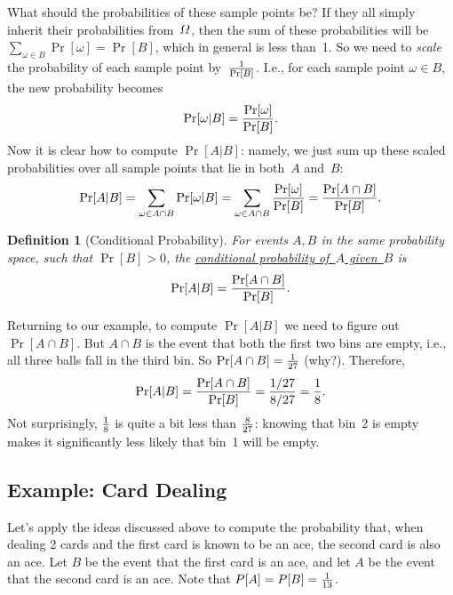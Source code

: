 \documentclass[11pt]{article}
\def\ul#1{\underline{#1}}
\def\VarOmega{\mathchar"10A }
\newcounter{thm}
\newtheorem{definition}{Definition}[thm]
\begin{document}
\begin{center}
\end{center}

What should the probabilities
of these sample points be?  If they all simply inherit their
probabilities from~$\VarOmega$, then the sum of these probabilities
will be $\sum_{\omega\in B}\Pr[\omega]=\Pr[B]$, which in general
is less than~1.  So we need to {\it scale\/} the probability
of each sample point by~$1\over{\Pr[B]}$.  I.e., for each sample
point $\omega\in B$, the new probability becomes $$
   \Pr[\omega\vert B]={{\Pr[\omega]}\over{\Pr[B]}}.  $$
   Now it is clear how to compute $\Pr[A\vert B]$: namely, we just
sum up these scaled probabilities over all sample points that
lie in both~$A$ and~$B$:  $$
   \Pr[A\vert B] = \sum_{\omega\in A\cap B} \Pr[\omega\vert B]
                 = \sum_{\omega\in A\cap B} {{\Pr[\omega]\over{\Pr[B]}}}
                 = {{\Pr[A\cap B]}\over{\Pr[B]}}.  $$

\begin{definition}[Conditional Probability]\label{defcp}
For events $A,B$ in the same probability space, such that 
$\Pr[B]>0$, the \ul{conditional probability of~$A$ given~$B$}
is $$
   \Pr[A\vert B] = {{\Pr[A\cap B]}\over{\Pr[B]}}.  $$
\end{definition}
   
Returning to our example, to compute $\Pr[A\vert B]$
we need to figure out $\Pr[A\cap B]$.  But $A\cap B$ is the event 
that both the first two bins are empty, i.e., all three balls fall in the
third bin.  So $\Pr[A\cap B]={1\over{27}}$ (why?).  Therefore, $$
   \Pr[A\vert B] = {{\Pr[A\cap B]}\over{\Pr[B]}} = {{1/27}\over{8/27}} = {1\over 8}.
 $$
Not surprisingly, $1\over 8$ is quite a bit less than $8\over{27}$: 
knowing that bin~2 is empty makes it significantly less likely that
bin~1 will be empty.
 
 \subsection*{Example: Card Dealing}

Let's apply the ideas discussed above to compute the probability 
that, when dealing 2 cards and the first card is known to be an ace,
the second card is also an ace. Let $B$ be the event that the first
card is an ace, and let $A$ be the event that the second card is an ace. 
Note that $P[A] = P[B] = {1\over 13}$. 
\end{document}
